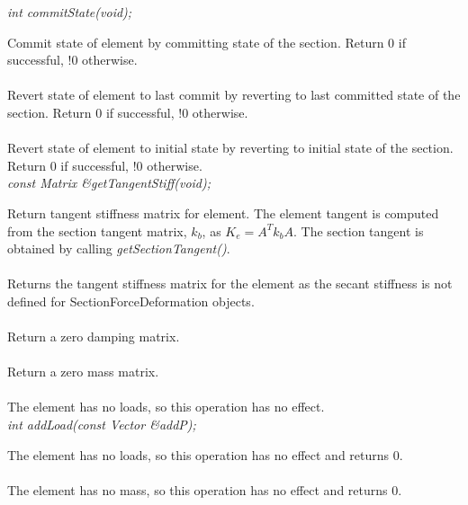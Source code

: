 {\em    int commitState(void);} 

Commit state of element by committing state of the section.
Return 0 if successful, !0 otherwise.
\\

 \\        
Revert state of element to last commit by reverting to last committed state of the section.
Return 0 if successful, !0 otherwise.
\\

 \\        
Revert state of element to initial state by reverting to initial state of the section.
Return 0 if successful, !0 otherwise.
\\

{\em    const Matrix \&getTangentStiff(void);} 

Return tangent stiffness matrix for element.  The element tangent is computed
from the section tangent matrix, $k_b$, as $K_e = A^T k_b A$.  The section
tangent is obtained by calling {\em getSectionTangent()}.
\\

 \\    
Returns the tangent stiffness matrix for the element as the secant stiffness
is not defined for SectionForceDeformation objects.
\\

 \\    
Return a zero damping matrix.
\\

 \\    
Return a zero mass matrix.
\\

 \\	
The element has no loads, so this operation has no effect.
\\

{\em    int addLoad(const Vector \&addP);} 

The element has no loads, so this operation has no effect and returns 0.
\\

 \\    
The element has no mass, so this operation has no effect and returns 0.
\\

